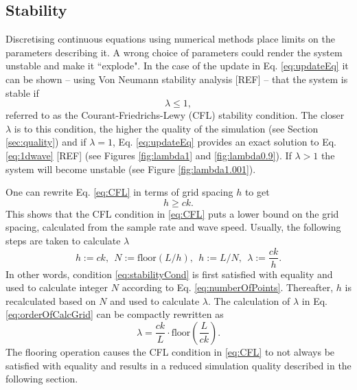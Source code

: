 \documentclass[dvipsnames, reprint]{JASA}
\begin{document}
\subsection{Stability}\label{sec:stability}
Discretising continuous equations using numerical methods place limits on the parameters describing it. A wrong choice of parameters could render the system unstable and make it ``explode". In the case of the update in Eq. \eqref{eq:updateEq} it can be shown -- using Von Neumann stability analysis [REF] -- that the system is stable if
\begin{equation}\label{eq:CFL}
    \lambda \leq 1,
\end{equation}
referred to as the Courant-Friedrichs-Lewy (CFL) stability condition. The closer $\lambda$ is to this condition, the higher the quality of the simulation (see Section \ref{sec:quality}) and if $\lambda = 1$, Eq. \eqref{eq:updateEq} provides an exact solution to Eq. \eqref{eq:1dwave} %
[REF] (see Figures \ref{fig:lambda1} and \ref{fig:lambda0.9}). If $\lambda > 1$ the system will become unstable (see Figure \ref{fig:lambda1.001}).
\begin{figure}
\end{figure}
One can rewrite Eq. \eqref{eq:CFL} in terms of grid spacing $h$ to get
\begin{equation}\label{eq:stabilityCond}
    h \geq ck.
\end{equation}
This shows that the CFL condition in \eqref{eq:CFL} puts a lower bound on the grid spacing, calculated from the sample rate and wave speed. Usually, the following steps are taken to calculate $\lambda$
\begin{equation}\label{eq:orderOfCalcGrid}
    h := ck,\ \ N := \text{floor}(L/h), \ \ h := L/N, \ \ \lambda := \frac{ck}{h}.
\end{equation}
In other words, condition \eqref{eq:stabilityCond} is first satisfied with equality and used to calculate integer $N$ according to Eq. \eqref{eq:numberOfPoints}. Thereafter, $h$ is recalculated based on $N$ and used to calculate $\lambda$. The calculation of $\lambda$ in Eq. \eqref{eq:orderOfCalcGrid} can be compactly rewritten as
\begin{equation}\label{eq:compactLambda}
    \lambda = \frac{ck}{L}\cdot\text{floor}\left(\frac{L}{ck}\right).
\end{equation}
The flooring operation causes the CFL condition in \eqref{eq:CFL} to not always be satisfied with equality and results in a reduced simulation quality described in the following section.
\end{document}
